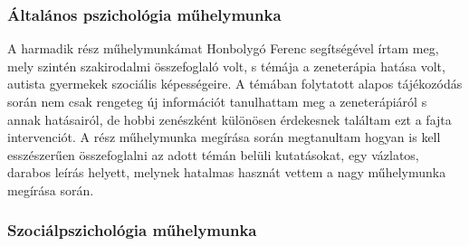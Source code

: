 \subsubsection*{Általános pszichológia műhelymunka}

\par A harmadik rész műhelymunkámat Honbolygó Ferenc segítségével írtam meg, mely szintén szakirodalmi összefoglaló volt, s témája a zeneterápia hatása volt, autista gyermekek szociális képességeire. A témában folytatott alapos tájékozódás során nem csak rengeteg új információt tanulhattam meg a zeneterápiáról s annak hatásairól, de hobbi zenészként különösen érdekesnek találtam ezt a fajta intervenciót. A rész műhelymunka megírása során megtanultam hogyan is kell esszészerűen összefoglalni az adott témán belüli kutatásokat, egy vázlatos, darabos leírás helyett, melynek hatalmas hasznát vettem a nagy műhelymunka megírása során.

\subsubsection*{Szociálpszichológia műhelymunka}

